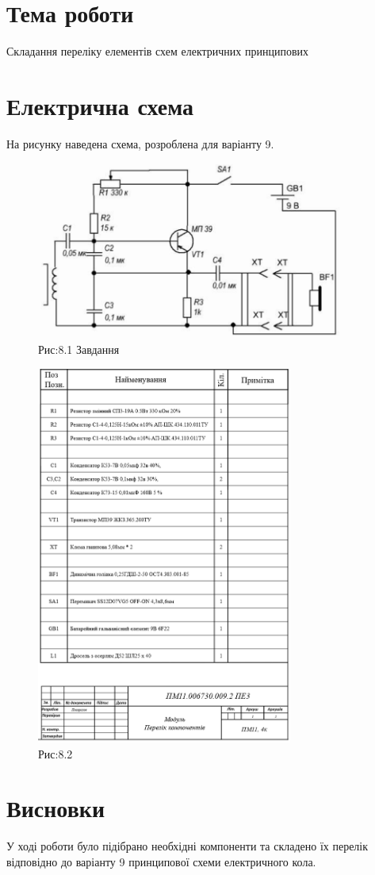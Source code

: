 \documentclass[a4paper]{article}
\begin{document}
\section*{Тема роботи}
Складання переліку елементів 
    схем електричних принципових
\section*{Електрична схема}
На рисунку наведена схема, розроблена для варіанту 9.

\begin{figure}[h]
    \centering
    \includegraphics[width=0.9\textwidth]{imgs/PW9.1.png}
    \caption*{Рис:8.1 Завдання}
\end{figure}

\newpage
\begin{figure}[h]
    \centering
    \includegraphics[width=0.75\textwidth]{imgs/PW8.png}
    \caption*{Рис:8.2}
\end{figure}

\section*{Висновки}
У ході роботи було підібрано необхідні компоненти та складено їх перелік відповідно до варіанту 9 принципової схеми електричного кола.
\end{document}
